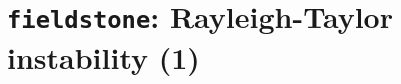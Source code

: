 \documentclass[a4paper]{article}
\begin{document}
\newpage
\section{{\tt fieldstone}: Rayleigh-Taylor instability (1)}



\end{document}
